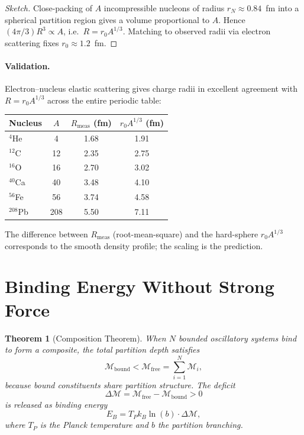 \documentclass[11pt,a4paper]{article}
\newtheorem{theorem}{Theorem}[section]
\theoremstyle{definition}
\theoremstyle{remark}
\newcommand{\kB}{k_{\scriptscriptstyle B}}
\newcommand{\Depth}{\mathcal{M}}
\newcommand{\Tp}{T_{\scriptscriptstyle P}}
\begin{document}
\begin{proof}[Sketch]
Close-packing of $A$ incompressible nucleons of radius $r_N\approx 0.84$~fm into a spherical partition region gives a volume proportional to $A$. Hence $(4\pi/3)R^3 \propto A$, i.e.\ $R = r_0 A^{1/3}$. Matching to observed radii via electron scattering fixes $r_0 \approx 1.2$~fm.
\end{proof}

\paragraph{Validation.} Electron--nucleus elastic scattering \citep{hofstadter1956} gives charge radii in excellent agreement with $R = r_0 A^{1/3}$ across the entire periodic table:

\begin{center}
\begin{tabular}{lccc}
\toprule
Nucleus & $A$ & $R_\mathrm{meas}$ (fm) & $r_0 A^{1/3}$ (fm) \\
\midrule
$^{4}$He   & 4   & 1.68 & 1.91 \\
$^{12}$C   & 12  & 2.35 & 2.75 \\
$^{16}$O   & 16  & 2.70 & 3.02 \\
$^{40}$Ca  & 40  & 3.48 & 4.10 \\
$^{56}$Fe  & 56  & 3.74 & 4.58 \\
$^{208}$Pb & 208 & 5.50 & 7.11 \\
\bottomrule
\end{tabular}
\end{center}

The difference between $R_\mathrm{meas}$ (root-mean-square) and the hard-sphere $r_0 A^{1/3}$ corresponds to the smooth density profile; the scaling is the prediction.

\section{Binding Energy Without Strong Force}
\label{sec:binding}

\begin{theorem}[Composition Theorem]
\label{thm:comp}
When $N$ bounded oscillatory systems bind to form a composite, the total partition depth satisfies
\[
\Depth_{\mathrm{bound}} < \Depth_{\mathrm{free}} = \sum_{i=1}^N \Depth_i,
\]
because bound constituents \emph{share partition structure}. The deficit
\[
\Delta\Depth = \Depth_{\mathrm{free}} - \Depth_{\mathrm{bound}} > 0
\]
is released as binding energy
\[
E_B = \Tp \kB \ln(b)\cdot \Delta\Depth,
\]
where $\Tp$ is the Planck temperature and $b$ the partition branching.
\end{theorem}
\end{document}
